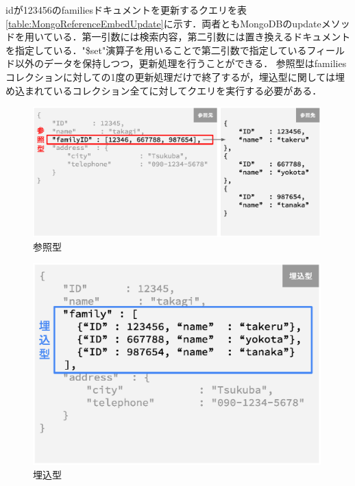 \documentclass[a4paper,11pt]{ujreport}
\begin{document}
idが123456のfamiliesドキュメントを更新するクエリを表\ref{table:MongoReferenceEmbedUpdate}に示す．両者ともMongoDBのupdateメソッドを用いている．第一引数には検索内容，第二引数には置き換えるドキュメントを指定している．"\$set"演算子を用いることで第二引数で指定しているフィールド以外のデータを保持しつつ，更新処理を行うことができる．
参照型はfamiliesコレクションに対しての1度の更新処理だけで終了するが，埋込型に関しては埋め込まれているコレクション全てに対してクエリを実行する必要がある．
\begin{figure}[htbp]
	\begin{center}
		\includegraphics[width=30em, trim=0 5em 0 2em]{src/Reference.eps} %
	\end{center}
	\caption{参照型}
	\label{figure:Reference}
\end{figure}
\begin{figure}[htbp]
	\begin{center}
		\includegraphics[width=30em, trim=0 7em 0 0em]{src/Embed.eps} %
	\end{center}
	\caption{埋込型}
	\label{figure:Embed}
\end{figure}
\end{document}
